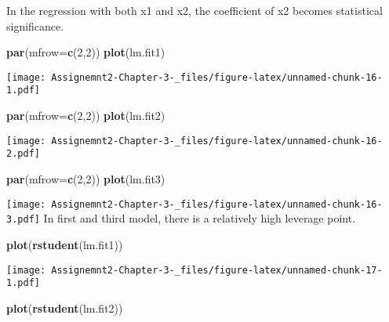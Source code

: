 \documentclass[]{article}
\newenvironment{Shaded}{\begin{snugshade}}{\end{snugshade}}
\newcommand{\DataTypeTok}[1]{\textcolor[rgb]{0.13,0.29,0.53}{#1}}
\newcommand{\DecValTok}[1]{\textcolor[rgb]{0.00,0.00,0.81}{#1}}
\newcommand{\KeywordTok}[1]{\textcolor[rgb]{0.13,0.29,0.53}{\textbf{#1}}}
\newcommand{\NormalTok}[1]{#1}
\begin{document}
In the regression with both x1 and x2, the coefficient of x2 becomes
statistical significance.

\begin{Shaded}
\begin{Highlighting}[]
\KeywordTok{par}\NormalTok{(}\DataTypeTok{mfrow=}\KeywordTok{c}\NormalTok{(}\DecValTok{2}\NormalTok{,}\DecValTok{2}\NormalTok{))}
\KeywordTok{plot}\NormalTok{(lm.fit1)}
\end{Highlighting}
\end{Shaded}

\texttt{[image: Assignemnt2-Chapter-3-\_files/figure-latex/unnamed-chunk-16-1.pdf]}

\begin{Shaded}
\begin{Highlighting}[]
\KeywordTok{par}\NormalTok{(}\DataTypeTok{mfrow=}\KeywordTok{c}\NormalTok{(}\DecValTok{2}\NormalTok{,}\DecValTok{2}\NormalTok{))}
\KeywordTok{plot}\NormalTok{(lm.fit2)}
\end{Highlighting}
\end{Shaded}

\texttt{[image: Assignemnt2-Chapter-3-\_files/figure-latex/unnamed-chunk-16-2.pdf]}

\begin{Shaded}
\begin{Highlighting}[]
\KeywordTok{par}\NormalTok{(}\DataTypeTok{mfrow=}\KeywordTok{c}\NormalTok{(}\DecValTok{2}\NormalTok{,}\DecValTok{2}\NormalTok{))}
\KeywordTok{plot}\NormalTok{(lm.fit3)}
\end{Highlighting}
\end{Shaded}

\texttt{[image: Assignemnt2-Chapter-3-\_files/figure-latex/unnamed-chunk-16-3.pdf]}
In first and third model, there is a relatively high leverage point.

\begin{Shaded}
\begin{Highlighting}[]
\KeywordTok{plot}\NormalTok{(}\KeywordTok{rstudent}\NormalTok{(lm.fit1))}
\end{Highlighting}
\end{Shaded}

\texttt{[image: Assignemnt2-Chapter-3-\_files/figure-latex/unnamed-chunk-17-1.pdf]}

\begin{Shaded}
\begin{Highlighting}[]
\KeywordTok{plot}\NormalTok{(}\KeywordTok{rstudent}\NormalTok{(lm.fit2))}
\end{Highlighting}
\end{Shaded}
\end{document}
